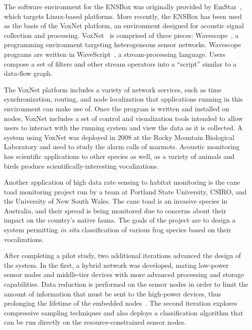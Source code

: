 The software environment for the ENSBox was originally provided by
EmStar~\cite{emstar}, which targets Linux-based platforms. More recently, the
ENSBox has been used as the basis of the VoxNet platform, an environment
designed for acoustic signal collection and processing.
VoxNet~\cite{voxnet-ipsn08} is comprised of three pieces:
Wavescope~\cite{wavescope}, a programming environment targeting
heterogeneous sensor networks. Wavescope programs are written in
WaveScript~\cite{wavescript-techreport08}, a stream-processing language.
Users compose a set of filters and other stream operators into a ``script''
similar to a data-flow graph.

The VoxNet platform includes a variety of network services, such as
time synchronization, routing, and node localization that applications
running in this environment can make use of. Once the program is written and
installed on nodes, VoxNet includes a set of control and visualization tools
intended to allow users to interact with the running system and view the data
as it is collected. A system using VoxNet was deployed in 2008 at the Rocky
Mountain Biological Laboratory and used to study the alarm calls of marmots.
Acoustic monitoring has scientific applications to other species as well, as
a variety of animals and birds produce scientifically-interesting
vocalizations.

Another application of high data rate sensing to habitat monitoring is the
cane toad monitoring project run by a team at Portland State University,
CSIRO, and the University of New South Wales. The cane toad is an invasive
species in Australia, and their spread is being monitored due to concerns
about their impact on the country's native fauna. The goals of the project
are to design a system permitting \textit{in situ} classification of various
frog species based on their vocalizations.

After completing a pilot study, two additional iterations advanced the design
of the system. In the first, a hybrid network was developed, mating low-power
sensor nodes and middle-tier devices with more advanced processing and
storage capabilities. Data reduction is performed on the sensor nodes in
order to limit the amount of information that must be sent to the high-power
devices, thus prolonging the lifetime of the embedded
nodes~\cite{canetoad-tosn}. The second iteration explores compressive
sampling techniques and also deploys a classification algorithm that can be
run directly on the resource-constrained sensor nodes.


